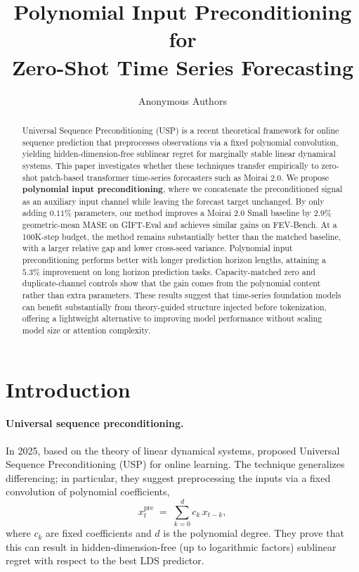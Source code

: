 \documentclass{article}
\title{Polynomial Input Preconditioning for\\Zero-Shot Time Series Forecasting}
\author{
  Anonymous Authors
}
\begin{document}
\maketitle

\begin{abstract}
Universal Sequence Preconditioning (USP) is a recent theoretical framework for online sequence prediction that preprocesses observations via a fixed polynomial convolution, yielding hidden-dimension-free sublinear regret for marginally stable linear dynamical systems. This paper investigates whether these techniques transfer empirically to zero-shot patch-based transformer time-series forecasters such as Moirai 2.0. We propose \textbf{polynomial input preconditioning}, where we concatenate the preconditioned signal as an auxiliary input channel while leaving the forecast target unchanged. By only adding $0.11\%$ parameters, our method improves a Moirai 2.0 Small baseline by $2.9\%$ geometric-mean MASE on GIFT-Eval and achieves similar gains on FEV-Bench. At a 100K-step budget, the method remains substantially better than the matched baseline, with a larger relative gap and lower cross-seed variance. Polynomial input preconditioning performs better with longer prediction horizon lengths, attaining a $5.3\%$ improvement on long horizon prediction tasks. Capacity-matched zero and duplicate-channel controls show that the gain comes from the polynomial content rather than extra parameters. These results suggest that time-series foundation models can benefit substantially from theory-guided structure injected before tokenization, offering a lightweight alternative to improving model performance without scaling model size or attention complexity.
\end{abstract}

\section{Introduction}

\paragraph{Universal sequence preconditioning.} In 2025, based on the theory of linear dynamical systems, \citet{marsden2024universal} proposed Universal Sequence Preconditioning (USP) for online learning. The technique generalizes differencing; in particular, they suggest preprocessing the inputs via a fixed convolution of polynomial coefficients,
\[
x_t^{\mathrm{pre}} \;=\; \sum_{k=0}^{d} c_k\,x_{t-k},
\]
where $c_k$ are fixed coefficients and $d$ is the polynomial degree. They prove that this can result in hidden-dimension-free (up to logarithmic factors) sublinear regret with respect to the best LDS predictor.
\end{document}

